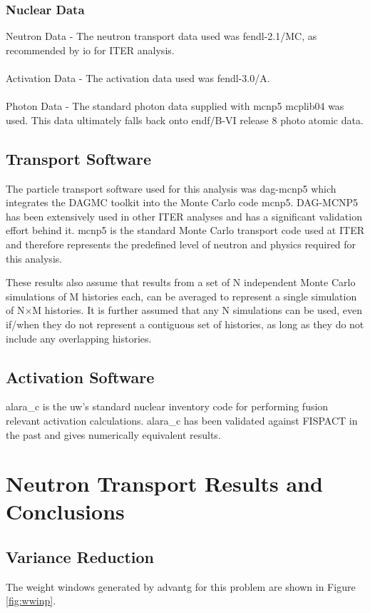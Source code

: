 \documentclass[12pt]{article}
\begin{document}
\subsubsection*{Nuclear Data}
Neutron Data - The neutron transport data used was \gls{fendl}-2.1/MC, as 
recommended by \gls{io} for ITER analysis. 
\\
\\
Activation Data - The activation data used was \gls{fendl}-3.0/A.
\\
\\
Photon Data - The standard photon data supplied with \gls{mcnp5} mcplib04 was 
used. This data ultimately falls back onto \gls{endf}/B-VI release 8 photo
atomic data.

\subsection{Transport Software}
The particle transport software used for this analysis was \gls{dag}-\gls{mcnp5}
which integrates the DAGMC toolkit into the Monte Carlo code \gls{mcnp5}. 
DAG-MCNP5 has been extensively used in other ITER analyses and has a significant
validation effort behind it. \gls{mcnp5} is the standard Monte Carlo transport code
used at ITER and therefore represents the predefined level of neutron and physics
required for this analysis.

These results also assume that results from a set of N independent Monte Carlo
simulations of M histories each, can be averaged to represent a single
simulation of N$\times$M histories.  It is further assumed that any N
simulations can be used, even if/when they do not represent a contiguous set
of histories, as long as they do not include any overlapping histories.

\subsection{Activation Software}
\gls{alara_c} is the \gls{uw}'s standard nuclear inventory code for performing
fusion relevant activation calculations. \gls{alara_c} has been validated against 
FISPACT \cite{fispact} in the past and gives numerically equivalent results. 

\newpage
\clearpage
\section{Neutron Transport Results and Conclusions}

\subsection{Variance Reduction}
The weight windows generated by \gls{advantg} for this problem are shown in Figure
\ref{fig:wwinp}. 
\end{document}
